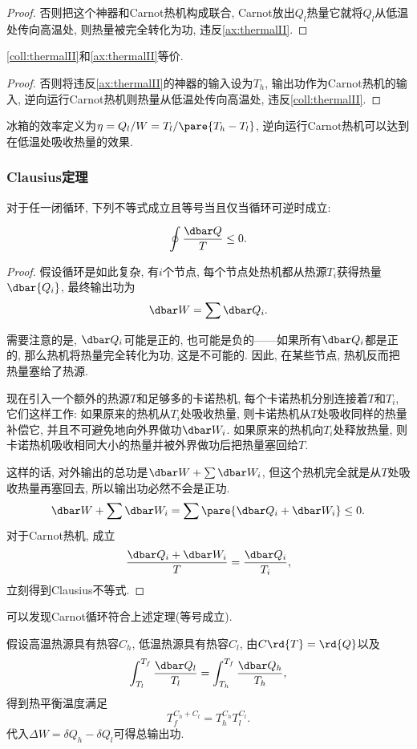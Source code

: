 \documentclass[../Thermal.tex]{subfiles}
\begin{document}
\begin{proof}
否则把这个神器和Carnot热机构成联合, Carnot放出$Q_l$热量它就将$Q_l$从低温处传向高温处, 则热量被完全转化为功, 违反\cref{ax:thermalII}.
\end{proof}
\begin{theorem}
\cref{coll:thermalII}和\cref{ax:thermalII}等价.
\end{theorem}
\begin{proof}
否则将违反\cref{ax:thermalII}的神器的输入设为$T_h$, 输出功作为Carnot热机的输入, 逆向运行Carnot热机则热量从低温处传向高温处, 违反\cref{coll:thermalII}.
\end{proof}
\begin{ex}[逆向运行的热机]
冰箱的效率定义为$\eta = Q_l/W = T_l/\pare{T_h - T_l}$, 逆向运行Carnot热机可以达到在低温处吸收热量的效果.
\end{ex}
\subsubsection{Clausius定理}
\begin{theorem}[Clausius定理]
对于任一闭循环, 下列不等式成立且等号当且仅当循环可逆时成立:
\begin{finale}
\[ \oint \frac{\dbar Q}{T} \le 0. \]
\end{finale}
\end{theorem}
\begin{proof}
假设循环是如此复杂, 有$i$个节点, 每个节点处热机都从热源$T_i$获得热量$\dbar{Q_i}$, 最终输出功为
\[ \dbar W = \sum \dbar Q_i. \]
\par
需要注意的是, $\dbar Q_i$可能是正的, 也可能是负的——如果所有$\dbar Q_i$都是正的, 那么热机将热量完全转化为功, 这是不可能的. 因此, 在某些节点, 热机反而把热量塞给了热源.
\par
现在引入一个额外的热源$T$和足够多的卡诺热机, 每个卡诺热机分别连接着$T$和$T_i$, 它们这样工作: 如果原来的热机从$T_i$处吸收热量, 则卡诺热机从$T$处吸收同样的热量补偿它, 并且不可避免地向外界做功$\dbar W_i$. 如果原来的热机向$T_i$处释放热量, 则卡诺热机吸收相同大小的热量并被外界做功后把热量塞回给$T$.
\par
这样的话, 对外输出的总功是$\dbar W + \sum \dbar W_i$, 但这个热机完全就是从$T$处吸收热量再塞回去, 所以输出功必然不会是正功.
\[ \dbar W + \sum \dbar W_i = \sum \pare{\dbar Q_i + \dbar W_i} \le 0. \]
对于Carnot热机, 成立
\[ \frac{\dbar Q_i + \dbar W_i}{T} = \frac{\dbar Q_i}{T_i}, \]
立刻得到Clausius不等式.
\end{proof}
\begin{ex}
可以发现Carnot循环符合上述定理(等号成立).
\end{ex}
\begin{ex}
假设高温热源具有热容$C_h$, 低温热源具有热容$C_l$, 由$C\rd{T} = \rd{Q}$以及
\[ \int_{T_l}^{T_f}\frac{\dbar Q_l}{T_l} = \int_{T_h}^{T_f}\frac{\dbar Q_h}{T_h}, \]
得到热平衡温度满足
\[ T_f^{C_h+C_l} = T_h^{C_h}T_l^{C_l}. \]
代入$\Delta W = \delta Q_h - \delta Q_l$可得总输出功.
\end{ex}
\end{document}
